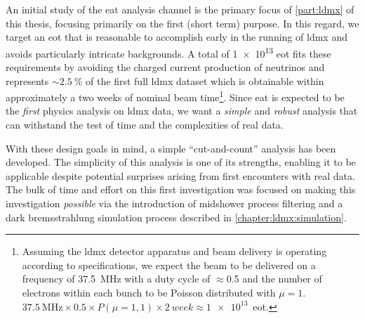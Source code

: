 An initial study of the \ac{eat} analysis channel is the primary focus of \cref{part:ldmx} of this
thesis, focusing primarily on the first (short term) purpose. In this regard, we target an \ac{eot}
that is reasonable to accomplish early in the running of \ac{ldmx} and avoids particularly
intricate backgrounds. A total of \num{1e13} \ac{eot} fits these requirements by avoiding the
charged current production of neutrinos and represents $\sim\qty{2.5}{\percent}$
of the first full \ac{ldmx} dataset which is obtainable within approximately a two weeks
of nominal beam time\footnote{%
  Assuming the \ac{ldmx} detector apparatus and beam delivery is operating according to specifications,
  we expect the beam to be delivered on a frequency of \qty{37.5}{\mega\hertz} with a duty cycle of $\approx$\num{0.5} and the
  number of electrons within each bunch to be Poisson distributed with $\mu=1$.
  $\qty{37.5}{\mega\hertz}\times0.5\times P(\mu=1,1) \times\qty{2}{week}\approx\num{1e13}$~\ac{eot}.
}. Since \ac{eat} is expected to be the \emph{first} physics analysis on \ac{ldmx} data, we want a
\emph{simple} and \emph{robust} analysis that can withstand the test of time and the complexities
of real data.

With these design goals in mind, a simple ``cut-and-count'' analysis has been developed. The
simplicity of this analysis is one of its strengths, enabling it to be applicable despite potential
surprises arising from first encounters with real data. The bulk of time and effort on this first
investigation was focused on making this investigation \emph{possible} via the introduction of
midshower process filtering and a dark bremsstrahlung simulation process described in
\cref{chapter:ldmx:simulation}.

